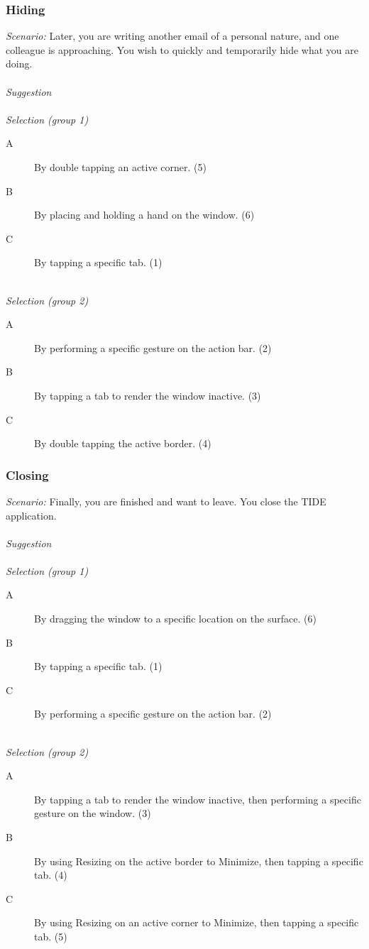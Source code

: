 
\subsubsection{Hiding}

\emph{Scenario:}
Later, you are writing another email of a personal nature, and one colleague is approaching. You wish to quickly and temporarily hide what you are doing.
\hfill\\
\hfill\\
\emph{Suggestion}
\hfill\\
\hfill\\
\emph{Selection (group 1)}
\begin{description}
\item[A]{By double tapping an active corner. (5)}
\item[B]{By placing and holding a hand on the window. (6)}
\item[C]{By tapping a specific tab. (1)}
\end{description}
\hfill\\
\emph{Selection (group 2)}
\begin{description}
\item[A]{By performing a specific gesture on the action bar. (2)}
\item[B]{By tapping a tab to render the window inactive. (3)}
\item[C]{By double tapping the active border. (4)}
\end{description}



\subsubsection{Closing}

\emph{Scenario:}
Finally, you are finished and want to leave. You close the TIDE application.
\hfill\\
\hfill\\
\emph{Suggestion}
\hfill\\
\hfill\\
\emph{Selection (group 1)}
\begin{description}
\item[A]{By dragging the window to a specific location on the surface. (6)}
\item[B]{By tapping a specific tab. (1)}
\item[C]{By performing a specific gesture on the action bar. (2)}
\end{description}
\hfill\\
\emph{Selection (group 2)}
\begin{description}
\item[A]{By tapping a tab to render the window inactive, then performing a specific gesture on the window. (3)}
\item[B]{By using Resizing on the active border to Minimize, then tapping a specific tab. (4)}
\item[C]{By using Resizing on an active corner to Minimize, then tapping a specific tab. (5)}
\end{description}



